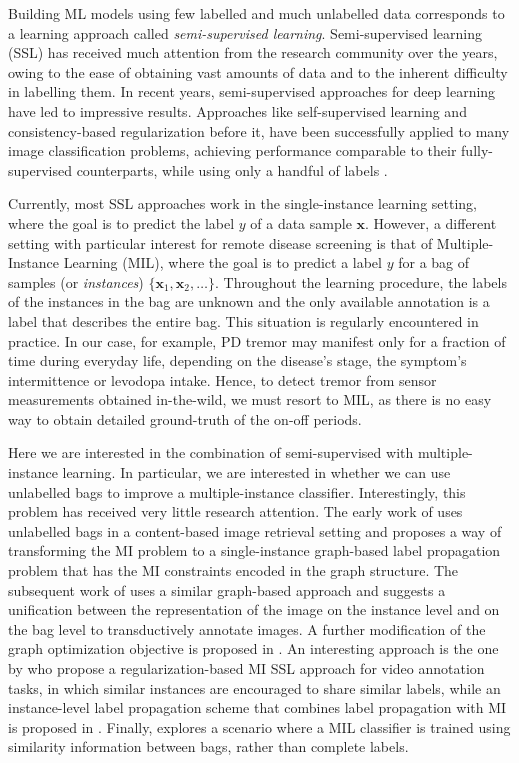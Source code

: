 \documentclass[journal,twoside,web]{ieeecolor}
\begin{document}
Building ML models using few labelled and much unlabelled data corresponds to a
learning approach called \emph{semi-supervised learning}. Semi-supervised
learning (SSL) has received much attention from the research community over the
years, owing to the ease of obtaining vast amounts of data and to the inherent
difficulty in labelling them. In recent years, semi-supervised
approaches for deep learning have 
led to impressive results. %
Approaches like self-supervised learning \cite{9086055} and consistency-based
regularization \cite{46794} before it, have been successfully applied to many
image  classification problems, achieving performance comparable to their
fully-supervised counterparts, while using only a  handful of labels
\cite{verma2019interpolation, berthelot2019mixmatch, bachman2019learning}.

Currently, most SSL approaches work in the single-instance
learning setting, where the goal is to predict the label $y$ of a data
sample $\mathbf{x}$. However, a different setting with particular interest for
remote disease screening  is that of Multiple-Instance Learning (MIL), where the
goal is to predict a label $y$ for a bag of samples (or \emph{instances})
$\{\mathbf{x}_1, \mathbf{x}_2, \dots\}$. Throughout the learning procedure, the
labels of the instances in the bag are unknown and the  only available
annotation is a label that describes the entire bag. This situation is regularly
encountered in practice. In our case, for example, PD tremor may manifest only for a
fraction of time during everyday life, depending on the disease's stage, the
symptom's intermittence or levodopa intake.  Hence, to detect tremor from
sensor measurements obtained in-the-wild, we must resort to MIL, as there is no
easy way to obtain detailed ground-truth of the on-off periods.

Here we are interested in the combination of semi-supervised with
multiple-instance learning. In particular,
we are interested in whether we can use unlabelled bags
to improve a multiple-instance classifier.
Interestingly, this problem has received very little research attention.
The early work of \cite{rahmani2006missl} uses unlabelled bags
in a content-based image retrieval setting and proposes a way 
of transforming the MI problem to
a single-instance graph-based label propagation \cite{zhou2004learning} problem
that has the MI constraints encoded in the graph structure.
The subsequent work of \cite{tang2008integrated} uses a similar
graph-based approach and suggests a unification between
the representation of the image on the instance level
and on the bag level to transductively annotate images.
A further modification of the graph optimization objective
is proposed in \cite{jia2008instance}. An interesting approach is
the one by \cite{xu2012semi} who propose
a regularization-based MI SSL approach for video annotation tasks,
in which similar instances are encouraged to share similar labels,
while an instance-level label propagation scheme that combines
label propagation with MI is proposed in \cite{ijcai2017-410}.
Finally, \cite{10.1145/3447548.3467318} explores a scenario where a
MIL classifier is trained using similarity information between
bags, rather than complete labels. 
\end{document}
